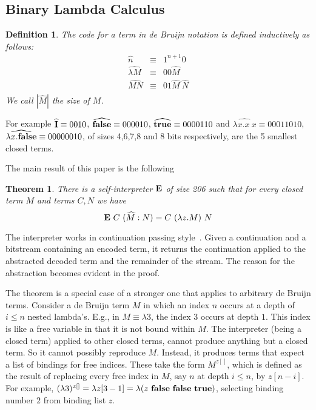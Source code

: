 \documentclass{article}
\newtheorem{theorem}{Theorem}
\newtheorem{definition}{Definition}
\newcommand{\pref}[2]{(#1:#2)}
\newcommand{\idx}[2]{#1[#2]}
\newcommand{\bnd}[2]{#1^{#2[]}}
\newcommand{\Ct}{{\bf true}}
\newcommand{\Cf}{{\bf false}}
\newcommand{\CI}{{\bf I}}
\newcommand{\CE}{{\bf E}}
\begin{document}
\subsection{Binary Lambda Calculus}

\begin{definition}
The code for a term in de Bruijn notation is defined
inductively as follows:
\begin{eqnarray*}
\widehat{n} & \equiv & 1^{n+1} 0 \\
\widehat{\lambda M} & \equiv & 0 0 \widehat{M} \\
\widehat{M N} & \equiv & 0 1 \widehat{M}\ \widehat{N} \\
\end{eqnarray*}
We call $|\widehat{M}|$ the {\em size} of $M$.
\end{definition}

For example
$\widehat{\CI} \equiv 0010$,
$\widehat{\Cf} \equiv 000010$,
$\widehat{\Ct} \equiv 0000110$ and
$\widehat{\lambda x.x\ x} \equiv 00011010$,
$\widehat{\lambda x.\Cf} \equiv 00000010$,
of sizes 4,6,7,8 and 8 bits respectively,
are the 5 smallest closed terms.

The main result of this paper is the following
\begin{theorem}
There is a self-interpreter $\CE$ of size 206
such that for every closed term $M$ and terms $C,N$ we have
\[ \CE\ C\ \pref{\widehat{M}}{N} = C\ (\lambda z.M)\ N \]
\label{int206}
\end{theorem}
The interpreter works in continuation passing style~\cite{fwh}.
Given a continuation and a bitstream containing an encoded term,
it returns the continuation applied to the abstracted decoded term 
and the remainder of the stream. The reason for the abstraction
becomes evident in the proof.

The theorem is a special case of a stronger
one that applies to arbitrary de Bruijn terms.
Consider a de Bruijn term $M$
in which an index $n$ occurs at a depth of
$i \leq n$ nested lambda's. E.g., in $M \equiv \lambda 3$,
the index $3$ occurs at depth $1$. This index is like
a free variable in that it is not bound within $M$.
The interpreter (being a closed term) applied to other closed terms,
cannot produce anything but a closed term. So it cannot possibly
reproduce $M$. Instead, it produces
terms that expect a list of bindings for free indices.
These take the form $\bnd{M}{z}$, which is defined
as the result of replacing every free index in $M$, say $n$
at depth $i\leq n$, by $\idx{z}{n-i}$. 
For example, $\bnd{(\lambda 3)}{z} = \lambda \idx{z}{3-1} =
\lambda (z\ \Cf\ \Cf\ \Ct)$,
selecting binding number $2$ from binding list $z$.
\end{document}
